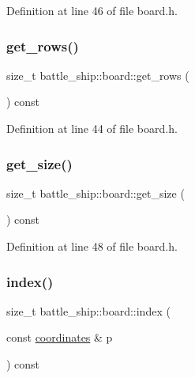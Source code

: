 Definition at line 46 of file board.\+h.

\mbox{\label{classbattle__ship_1_1board_af6bd8f003136c2a98151bbfa34f73142}} 
\subsubsection{\texorpdfstring{get\+\_\+rows()}{get\_rows()}}
{\footnotesize\ttfamily size\+\_\+t battle\+\_\+ship\+::board\+::get\+\_\+rows (\begin{DoxyParamCaption}{ }\end{DoxyParamCaption}) const\hspace{0.3cm}{\ttfamily [inline]}}



Definition at line 44 of file board.\+h.

\mbox{\label{classbattle__ship_1_1board_a483229b229338d1b5d1d19831c92d788}} 
\subsubsection{\texorpdfstring{get\+\_\+size()}{get\_size()}}
{\footnotesize\ttfamily size\+\_\+t battle\+\_\+ship\+::board\+::get\+\_\+size (\begin{DoxyParamCaption}{ }\end{DoxyParamCaption}) const\hspace{0.3cm}{\ttfamily [inline]}}



Definition at line 48 of file board.\+h.

\mbox{\label{classbattle__ship_1_1board_a9518167fb31ba4fb53091cc9d86e7dba}} 
\subsubsection{\texorpdfstring{index()}{index()}}
{\footnotesize\ttfamily size\+\_\+t battle\+\_\+ship\+::board\+::index (\begin{DoxyParamCaption}\item[{const \hyperlink{structbattle__ship_1_1coordinates}{coordinates} \&}]{p }\end{DoxyParamCaption}) const}



